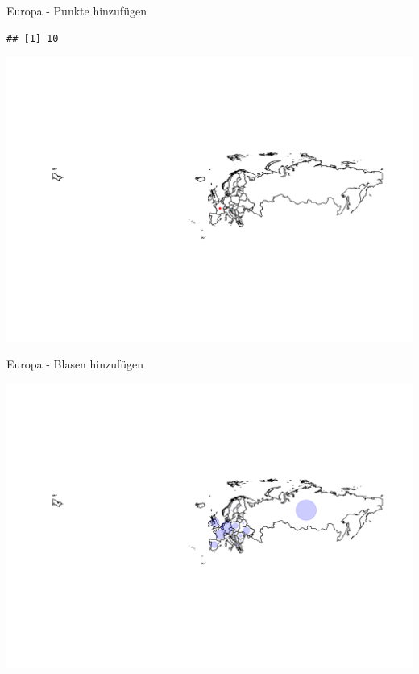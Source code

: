\documentclass[ignorenonframetext,]{beamer}
\begin{document}
\begin{frame}[fragile]{Europa - Punkte hinzufügen}

\begin{verbatim}
## [1] 10
\end{verbatim}

\includegraphics{Geomedizin_files/figure-beamer/unnamed-chunk-105-1.pdf}

\end{frame}

\begin{frame}{Europa - Blasen hinzufügen}

\includegraphics{Geomedizin_files/figure-beamer/unnamed-chunk-106-1.pdf}

\end{frame}
\end{document}
